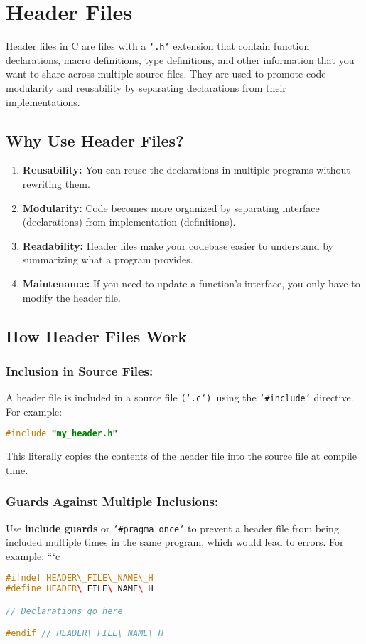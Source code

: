\section{Header Files}

Header files in C are files with a \texttt{`.h`} extension that contain function declarations, macro definitions, type definitions, and other information that you want to share across multiple source files. They are used to promote code modularity and reusability by separating declarations from their implementations.

\subsection{ Why Use Header Files?}
\begin{enumerate}
	\item\textbf{Reusability:} You can reuse the declarations in multiple programs without rewriting them.
	\item\textbf{Modularity:} Code becomes more organized by separating interface (declarations) from implementation (definitions).
	\item\textbf{Readability:} Header files make your codebase easier to understand by summarizing what a program provides.
	\item\textbf{Maintenance:} If you need to update a function's interface, you only have to modify the header file.
\end{enumerate}


\subsection{ How Header Files Work}
\subsubsection*{Inclusion in Source Files:  }
A header file is included in a source file \texttt{(`.c`) }using the \texttt{`\#include`} directive. For example:
\begin{lstlisting}[caption=Example C++, label={lst:listing-cpp}, language=C++, style=myStyle]
#include "my_header.h"
\end{lstlisting}

This literally copies the contents of the header file into the source file at compile time.

\subsubsection{Guards Against Multiple Inclusions:  }
Use \textbf{include guards} or \texttt{`\#pragma once`} to prevent a header file from being included multiple times in the same program, which would lead to errors. For example:
```c
\begin{lstlisting}[caption=Example C++, label={lst:listing-cpp}, language=C++, style=myStyle]
#ifndef HEADER\_FILE\_NAME\_H
#define HEADER\_FILE\_NAME\_H

// Declarations go here

#endif // HEADER\_FILE\_NAME\_H
\end{lstlisting}

